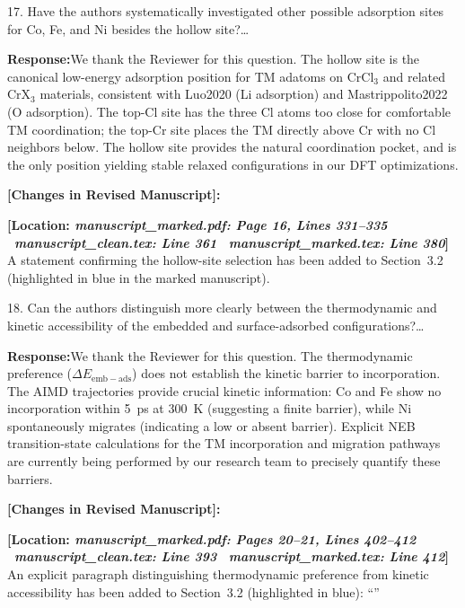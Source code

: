 \documentclass[11pt, sans, a4paper]{moderncv}
\newcommand{\response}{\vspace{0.4em}\noindent\textbf{\color{actionblue}Response:}\hspace{0.5em}}
\newcommand{\manuscriptchange}[1]{\vspace{0.4em}\noindent\textbf{\color{acsblue}[Changes in Revised Manuscript]:}\par\nopagebreak\vspace{0.15em}#1\vspace{0.4em}}
\begin{document}
\vspace{0.8em}

\begin{reviewercomment}
17. Have the authors systematically investigated other possible adsorption sites for Co, Fe, and Ni besides the hollow site?\ldots
\end{reviewercomment}

\response We thank the Reviewer for this question. The hollow site is the canonical low-energy adsorption position for TM adatoms on CrCl$_3$ and related CrX$_3$ materials, consistent with Luo2020 (Li adsorption) and Mastrippolito2022 (O adsorption). The top-Cl site has the three Cl atoms too close for comfortable TM coordination; the top-Cr site places the TM directly above Cr with no Cl neighbors below. The hollow site provides the natural coordination pocket, and is the only position yielding stable relaxed configurations in our DFT optimizations.

\manuscriptchange{\textbf{[Location: \textit{manuscript\_marked.pdf: Page 16, Lines 331--335} \textbar\ \textit{manuscript\_clean.tex: Line 361} \textbar\ \textit{manuscript\_marked.tex: Line 380}]}\\ A statement confirming the hollow-site selection has been added to Section~3.2 (highlighted in blue in the marked manuscript).}

\vspace{0.8em}

\begin{reviewercomment}
18. Can the authors distinguish more clearly between the thermodynamic and kinetic accessibility of the embedded and surface-adsorbed configurations?\ldots
\end{reviewercomment}

\response We thank the Reviewer for this question. The thermodynamic preference ($\Delta E_{\mathrm{emb-ads}}$) does not establish the kinetic barrier to incorporation. The AIMD trajectories provide crucial kinetic information: Co and Fe show no incorporation within 5~ps at 300~K (suggesting a finite barrier), while Ni spontaneously migrates (indicating a low or absent barrier). Explicit NEB transition-state calculations for the TM incorporation and migration pathways are currently being performed by our research team to precisely quantify these barriers.

\manuscriptchange{\textbf{[Location: \textit{manuscript\_marked.pdf: Pages 20--21, Lines 402--412} \textbar\ \textit{manuscript\_clean.tex: Line 393} \textbar\ \textit{manuscript\_marked.tex: Line 412}]}\\ An explicit paragraph distinguishing thermodynamic preference from kinetic accessibility has been added to Section~3.2 (highlighted in blue): ``{\itshape \ExecuteMetaData[manuscript_marked.tex]{StabilityHierarchy}}''}
\end{document}
